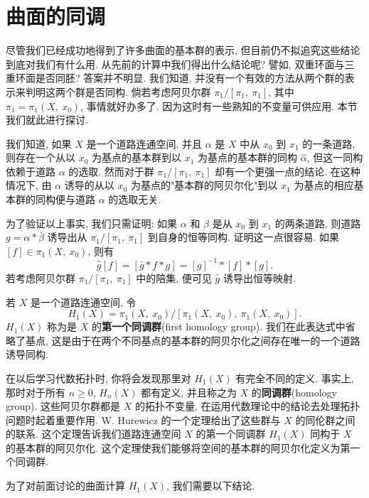 ﻿\section{曲面的同调}
\label{ch12-sec75}

尽管我们已经成功地得到了许多曲面的基本群的表示, 但目前仍不拟追究这些结论到底对我们有什么用. 从先前的计算中我们得出什么结论呢? 譬如, 双重环面与三重环面是否同胚? 答案并不明显. 我们知道, 并没有一个有效的方法从两个群的表示来判明这两个群是否同构. 倘若考虑阿贝尔群 $\pi_{1}/[\pi_{1},\ \pi_{1}]$, 其中 $\pi_{1}=\pi_{1}(X,\ x_{0})$, 事情就好办多了. 因为这时有一些熟知的不变量可供应用. 本节我们就此进行探讨.

我们知道, 如果 $X$ 是一个道路连通空间, 并且 $\alpha$ 是 $X$ 中从 $x_{0}$ 到 $x_{1}$ 的一条道路, 则存在一个从以 $x_{0}$ 为基点的基本群到以 $x_{1}$ 为基点的基本群的同构 $\widehat{\alpha}$, 但这一同构依赖于道路 $\alpha$ 的选取. 然而对于群 $\pi_{1}/[\pi_{1},\ \pi_{1}]$ 却有一个更强一点的结论. 在这种情况下, 由 $\alpha$ 诱导的从以 $x_{0}$ 为基点的"基本群的阿贝尔化"到以 $x_{1}$ 为基点的相应基本群的同构便与道路 $\alpha$ 的选取无关.

为了验证以上事实, 我们只需证明: 如果 $\alpha$ 和 $\beta$ 是从 $x_{0}$ 到 $x_{1}$ 的两条道路, 则道路 $g=\alpha*\bar{\beta}$ 诱导出从 $\pi_{1}/[\pi_{1},\ \pi_{1}]$ 到自身的恒等同构. 证明这一点很容易. 如果 $[f]\in\pi_{1}(X,\ x_{0})$, 则有
\[
\widehat{g}[f]=[\bar{g}*f*g]=[g]^{-1}*[f]*[g].
\]
若考虑阿贝尔群 $\pi_{1}/[\pi_{1},\ \pi_{1}]$ 中的陪集, 便可见 $\widehat{g}$ 诱导出恒等映射.

\begin{definition}[第一个同调群]
\label{definition:ch12-first-homology}
若 $X$ 是一个道路连通空间, 令
\[
H_{1}(X)=\pi_{1}(X,\ x_{0})/[\pi_{1}(X,\ x_{0}),\ \pi_{1}(X,\ x_{0})].
\]
$H_{1}(X)$ 称为是 $X$ 的\textbf{第一个同调群}(first homology group). 我们在此表达式中省略了基点, 这是由于在两个不同基点的基本群的阿贝尔化之间存在唯一的一个道路诱导同构.
\end{definition}

在以后学习代数拓扑时, 你将会发现那里对 $H_{1}(X)$ 有完全不同的定义. 事实上, 那时对于所有 $n\geqslant 0$, $H_{n}(X)$ 都有定义, 并且称之为 $X$ 的\textbf{同调群}(homology group). 这些阿贝尔群都是 $X$ 的拓扑不变量, 在运用代数理论中的结论去处理拓扑问题时起着重要作用. W. Hurewicz 的一个定理给出了这些群与 $X$ 的同伦群之间的联系. 这个定理告诉我们道路连通空间 $X$ 的第一个同调群 $H_{1}(X)$ 同构于 $X$ 的基本群的阿贝尔化. 这个定理使我们能够将空间的基本群的阿贝尔化定义为第一个同调群.

为了对前面讨论的曲面计算 $H_{1}(X)$, 我们需要以下结论.

